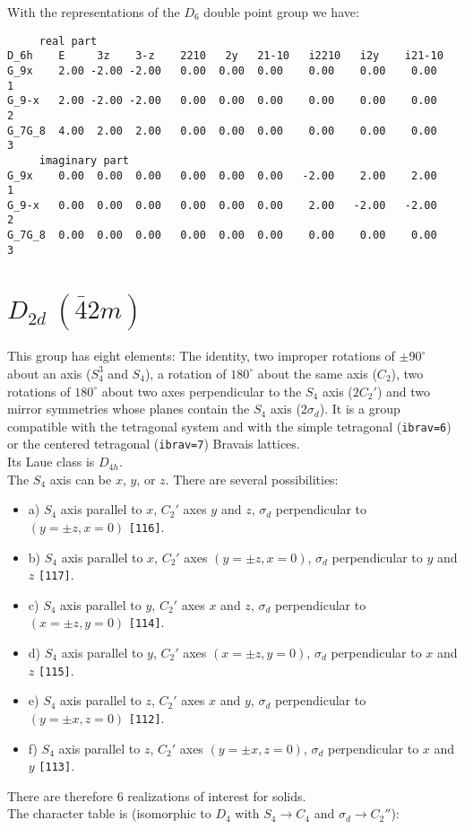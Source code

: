 \documentclass[12pt,a4paper,twoside]{report}
\begin{document}
With the representations of the $D_6$ double point group we have:

\begin{tcolorbox}
\begin{footnotesize}
\begin{verbatim}
     real part
D_6h    E     3z    3-z    2210   2y   21-10   i2210   i2y    i21-10
G_9x    2.00 -2.00 -2.00   0.00  0.00  0.00    0.00    0.00    0.00     1
G_9-x   2.00 -2.00 -2.00   0.00  0.00  0.00    0.00    0.00    0.00     2
G_7G_8  4.00  2.00  2.00   0.00  0.00  0.00    0.00    0.00    0.00     3
     imaginary part
G_9x    0.00  0.00  0.00   0.00  0.00  0.00   -2.00    2.00    2.00     1
G_9-x   0.00  0.00  0.00   0.00  0.00  0.00    2.00   -2.00   -2.00     2
G_7G_8  0.00  0.00  0.00   0.00  0.00  0.00    0.00    0.00    0.00     3
\end{verbatim}
\end{footnotesize}
\end{tcolorbox}


\newpage
{\color{coral}\section{$D_{2d}\ (\bar 42m)$}} 
\color{black}
This group has eight elements: The identity, two improper rotations 
of $\pm90^\circ$ about an axis ($S_4^3$ and $S_4$), a rotation of 
$180^\circ$ about the same axis ($C_2$), two rotations of $180^\circ$ about
two axes perpendicular to the $S_4$ axis ($2C_2'$) and two mirror symmetries
whose planes contain the $S_4$ axis ($2\sigma_d$).
It is a group compatible with the tetragonal system and with the simple 
tetragonal (\texttt{ibrav=6}) or the centered tetragonal (\texttt{ibrav=7}) 
Bravais lattices. \\
Its Laue class is $D_{4h}$. \\
The $S_4$ axis can be $x$, $y$, or $z$. There are several possibilities:
\begin{itemize}
\item a) $S_4$ axis parallel to $x$, $C_2'$ axes $y$ and $z$, $\sigma_d$
perpendicular to $(y=\pm z, x=0)$ \texttt{[116]}.
\item b) $S_4$ axis parallel to $x$, $C_2'$ axes $(y=\pm z, x=0)$, $\sigma_d$
perpendicular to $y$ and $z$ \texttt{[117]}.
\item c) $S_4$ axis parallel to $y$, $C_2'$ axes $x$ and $z$, $\sigma_d$
perpendicular to $(x=\pm z, y=0)$ \texttt{[114]}.
\item d) $S_4$ axis parallel to $y$, $C_2'$ axes $(x=\pm z, y=0)$, $\sigma_d$
perpendicular to $x$ and $z$ \texttt{[115]}.
\item e) $S_4$ axis parallel to $z$, $C_2'$ axes $x$ and $y$, $\sigma_d$
perpendicular to $(y=\pm x, z=0)$ \texttt{[112]}.
\item f) $S_4$ axis parallel to $z$, $C_2'$ axes $(y=\pm x, z=0)$, $\sigma_d$
perpendicular to $x$ and $y$ \texttt{[113]}.
\end{itemize}
There are therefore $6$ realizations of interest for solids.\\
The character table is (isomorphic to $D_4$ with $S_4 \rightarrow C_4$
and $\sigma_d \rightarrow C_2''$):
\end{document}
